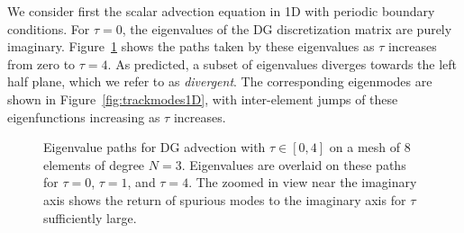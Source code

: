 \documentclass[10pt]{article}
\begin{document}
We consider first the scalar advection equation in 1D with periodic boundary conditions.  For $\tau = 0$, the eigenvalues of the DG discretization matrix are purely imaginary.  Figure~\ref{fig:track1D} shows the paths taken by these eigenvalues as $\tau$ increases from zero to $\tau = 4$.  As predicted, a subset of eigenvalues diverges towards the left half plane, which we refer to as \emph{divergent}.  The corresponding eigenmodes are shown in Figure~\ref{fig:trackmodes1D}, with inter-element jumps of these eigenfunctions increasing as $\tau$ increases.  

\begin{figure}
\centering
{}
\hspace{1em}
\caption{Eigenvalue paths for DG advection with $\tau \in [0,4]$ on a mesh of 8 elements of degree $N=3$.  Eigenvalues are overlaid on these paths for $\tau = 0$, $\tau = 1$, and $\tau = 4$.  The zoomed in view near the imaginary axis shows the return of spurious modes to the imaginary axis for $\tau$ sufficiently large. }
\label{fig:track1D}
\end{figure}
\end{document}
